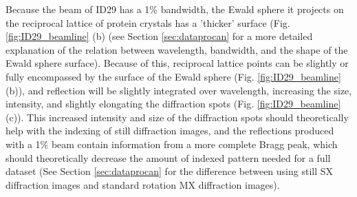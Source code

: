 Because the beam of ID29 has a 1\% bandwidth, the Ewald sphere it projects on the reciprocal lattice of protein crystals has a 'thicker' surface (Fig. \ref{fig:ID29_beamline} (b) (see Section \ref{sec:dataprocan} for a more detailed explanation of the relation between wavelength, bandwidth, and the shape of the Ewald sphere surface). Because of this, reciprocal lattice points can be slightly or fully encompassed by the surface of the Ewald sphere (Fig. \ref{fig:ID29_beamline} (b)), and reflection will be slightly integrated over wavelength, increasing the size, intensity, and slightly elongating the diffraction spots (Fig. \ref{fig:ID29_beamline} (c)). This increased intensity and size of the diffraction spots should theoretically help with the indexing of still diffraction images, and the reflections produced with a 1\% beam contain information from a more complete Bragg peak, which should theoretically decrease the amount of indexed pattern needed for a full dataset (See Section \ref{sec:dataprocan} for the difference between using still SX diffraction images and standard rotation MX diffraction images).

